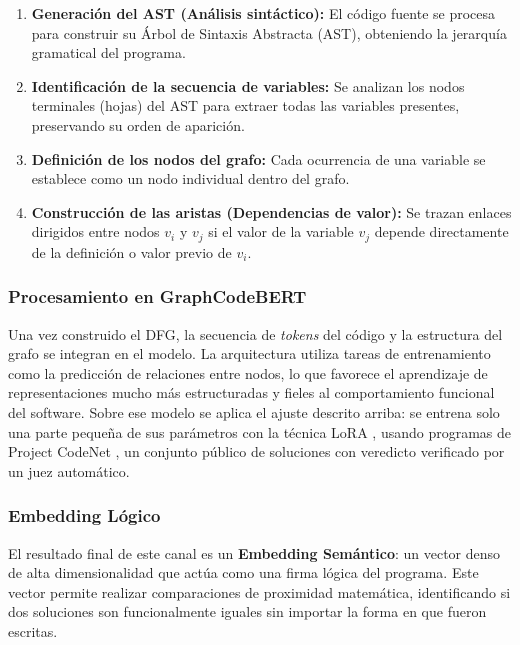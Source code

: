\begin{enumerate}
	\item \textbf{Generación del AST (Análisis sintáctico):} El código fuente se procesa para construir su Árbol de Sintaxis Abstracta (AST), obteniendo la jerarquía gramatical del programa.
	\item \textbf{Identificación de la secuencia de variables:} Se analizan los nodos terminales (hojas) del AST para extraer todas las variables presentes, preservando su orden de aparición.
	\item \textbf{Definición de los nodos del grafo:} Cada ocurrencia de una variable se establece como un nodo individual dentro del grafo.
	\item \textbf{Construcción de las aristas (Dependencias de valor):} Se trazan enlaces dirigidos entre nodos $v_i$ y $v_j$ si el valor de la variable $v_j$ depende directamente de la definición o valor previo de $v_i$.
\end{enumerate}

\subsubsection{Procesamiento en GraphCodeBERT}

Una vez construido el DFG, la secuencia de \textit{tokens} del código y la estructura del grafo se integran en el modelo. La arquitectura utiliza tareas de entrenamiento como la predicción de relaciones entre nodos, lo que favorece el aprendizaje de representaciones mucho más estructuradas y fieles al comportamiento funcional del software. Sobre ese modelo se aplica el ajuste descrito arriba: se entrena solo una parte pequeña de sus parámetros con la técnica LoRA \cite{Hu2022LoRA}, usando programas de Project CodeNet \cite{Puri2021CodeNet}, un conjunto público de soluciones con veredicto verificado por un juez automático.

\subsubsection{Embedding Lógico}

El resultado final de este canal es un \textbf{Embedding Semántico}: un vector denso de alta dimensionalidad que actúa como una firma lógica del programa. Este vector permite realizar comparaciones de proximidad matemática, identificando si dos soluciones son funcionalmente iguales sin importar la forma en que fueron escritas.

